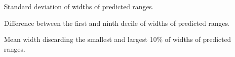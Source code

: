 \documentclass[letterpaper,10pt,english]{sphinxmanual}
\begin{document}
\begin{fulllineitems}
\begin{fulllineitems}
\end{fulllineitems}


\begin{fulllineitems}
\label{cp.evaluation:cp.evaluation.ResultsRegr.std_dev}
Standard deviation of widths of predicted ranges.

\end{fulllineitems}


\begin{fulllineitems}
\label{cp.evaluation:cp.evaluation.ResultsRegr.interdecile_range}
Difference between the first and ninth decile of widths of predicted ranges.

\end{fulllineitems}


\begin{fulllineitems}
\label{cp.evaluation:cp.evaluation.ResultsRegr.interdecile_mean}
Mean width discarding the smallest and largest 10\% of widths of predicted ranges.

\end{fulllineitems}


\end{fulllineitems}

\end{document}
